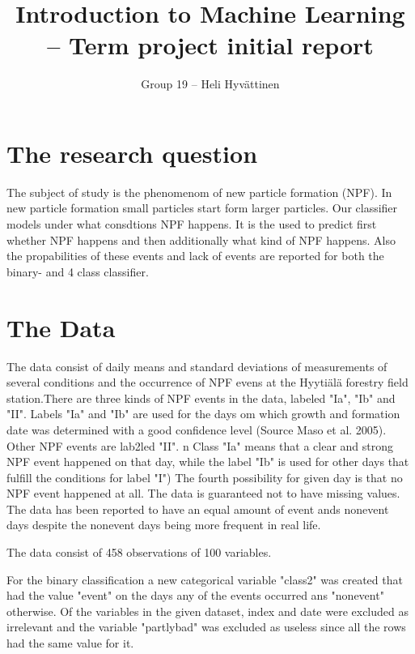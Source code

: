 \documentclass[a4size, 12pt]{report}
\begin{document}
	
	\author{Group 19 – Heli Hyvättinen}
	\title{Introduction to Machine Learning – Term project initial report }
	
	\maketitle
	
	\chapter{The research question}
	
	The subject of study is the phenomenom of new particle formation (NPF). In new particle formation small particles start form larger particles. Our classifier models under what consdtions NPF happens. It is the used to predict first whether NPF happens and then additionally what kind of NPF happens. Also the propabilities of these events and lack of events are reported for both the binary- and 4 class classifier.  
	     
	
	\chapter{The Data}
	
	The data consist of daily means and standard deviations of measurements of several conditions and the occurrence of NPF evens at the Hyytiälä forestry field station.There are three kinds of NPF events in the data, labeled "Ia", "Ib" and "II". Labels "Ia" and "Ib" are used for the days om which growth and formation date was determined with a good confidence level (Source Maso et al. 2005). Other NPF events are lab2led "II".
	n  Class "Ia" means that a clear and strong NPF event happened on that day, while the label "Ib" is used for other days that fulfill the conditions for label "I")  The fourth possibility for given day is that no NPF event happened at all. The data is guaranteed not to have missing values. The data has been reported to have an equal amount of event ands nonevent days despite the nonevent days being more frequent in real life.
	
	The data consist of 458 observations of 100 variables. 
	
	For the binary classification a new categorical variable "class2" was created that had the value "event" on the days any of the events occurred ans "nonevent" otherwise. Of the variables in the given dataset, index and date were excluded as irrelevant and the variable "partlybad" was excluded as useless since all the rows had the same value for it.  
	
\end{document}

